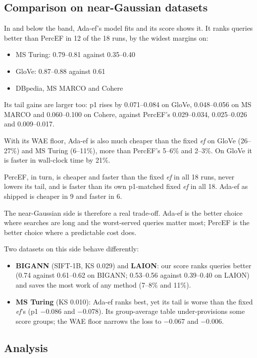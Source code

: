 \documentclass[sigconf, nonacm]{acmart}
\newcommand{\ef}{\textit{ef}}
\begin{document}
\subsection{Comparison on near-Gaussian datasets}\label{sec:neargauss}

In and below the band, Ada-ef's model fits and its score shows it. It ranks queries better than
PercEF in 12 of the 18 runs, by the widest margins on:
\begin{itemize}
\item MS Turing: 0.79--0.81 against 0.35--0.40
\item GloVe: 0.87--0.88 against 0.61
\item DBpedia, MS MARCO and Cohere
\end{itemize}
Its tail gains are larger too: p1 rises by 0.071--0.084 on GloVe, 0.048--0.056 on MS MARCO and
0.060--0.100 on Cohere, against PercEF's 0.029--0.034, 0.025--0.026 and 0.009--0.017.

With its WAE floor, Ada-ef is also much cheaper than the fixed \ef{} on GloVe (26--27\%) and MS
Turing (6--11\%), more than PercEF's 5--6\% and 2--3\%. On GloVe it is faster in wall-clock time by
21\%.

PercEF, in turn, is cheaper and faster than the fixed \ef{} in all 18 runs, never lowers its tail,
and is faster than its own p1-matched fixed \ef{} in all 18. Ada-ef as shipped is cheaper in 9 and
faster in 6.

The near-Gaussian side is therefore a real trade-off. Ada-ef is the better choice where searches are
long and the worst-served queries matter most; PercEF is the better choice where a predictable cost
does.

Two datasets on this side behave differently:
\begin{itemize}
\item \textbf{BIGANN} (SIFT-1B, KS 0.029) and \textbf{LAION}: our score ranks queries better
  (0.74 against 0.61--0.62 on BIGANN; 0.53--0.56 against 0.39--0.40 on LAION) and saves the most work
  of any method (7--8\% and 11\%).
\item \textbf{MS Turing} (KS 0.010): Ada-ef ranks best, yet its tail is worse than the fixed \ef{}'s
  (p1 $-$0.086 and $-$0.078). Its group-average table under-provisions some score groups; the WAE
  floor narrows the loss to $-$0.067 and $-$0.006.
\end{itemize}

\subsection{Analysis}\label{sec:analysis}
\end{document}
